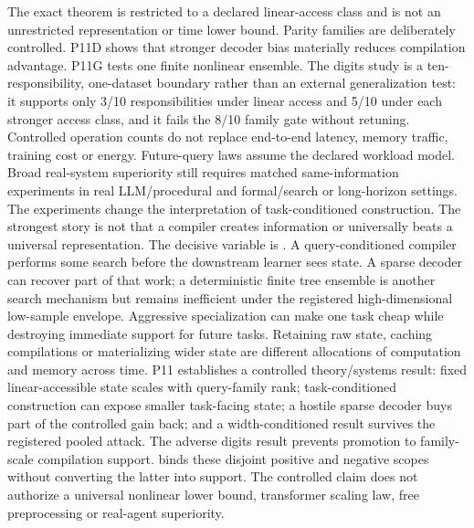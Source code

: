 \markdownRendererDocumentBegin
\markdownRendererSectionBegin
{}\markdownRendererInterblockSeparator
{}The exact theorem is restricted to a declared linear-access class and is not an unrestricted representation or time lower bound. Parity families are deliberately controlled. P11D shows that stronger decoder bias materially reduces compilation advantage. P11G tests one finite nonlinear ensemble. The digits study is a ten-responsibility, one-dataset boundary rather than an external generalization test: it supports only 3/10 responsibilities under linear access and 5/10 under each stronger access class, and it fails the 8/10 family gate without retuning. Controlled operation counts do not replace end-to-end latency, memory traffic, training cost or energy. Future-query laws assume the declared workload model. Broad real-system superiority still requires matched same-information experiments in real LLM/procedural and formal/search or long-horizon settings.\markdownRendererInterblockSeparator
{}The experiments change the interpretation of task-conditioned construction. The strongest story is not that a compiler creates information or universally beats a universal representation. The decisive variable is . A query-conditioned compiler performs some search before the downstream learner sees state. A sparse decoder can recover part of that work; a deterministic finite tree ensemble is another search mechanism but remains inefficient under the registered high-dimensional low-sample envelope.\markdownRendererInterblockSeparator
{}Aggressive specialization can make one task cheap while destroying immediate support for future tasks. Retaining raw state, caching compilations or materializing wider state are different allocations of computation and memory across time.\markdownRendererInterblockSeparator
{}P11 establishes a controlled theory/systems result: fixed linear-accessible state scales with query-family rank; task-conditioned construction can expose smaller task-facing state; a hostile sparse decoder buys part of the controlled gain back; and a width-conditioned  result survives the registered pooled attack. The adverse digits result prevents promotion to family-scale compilation support.  binds these disjoint positive and negative scopes without converting the latter into support.\markdownRendererInterblockSeparator
{}\markdownRendererBlockQuoteBegin
{}
\markdownRendererBlockQuoteEnd \markdownRendererInterblockSeparator
{}The controlled claim does not authorize a universal nonlinear lower bound, transformer scaling law, free preprocessing or real-agent superiority.
\markdownRendererSectionEnd \markdownRendererDocumentEnd